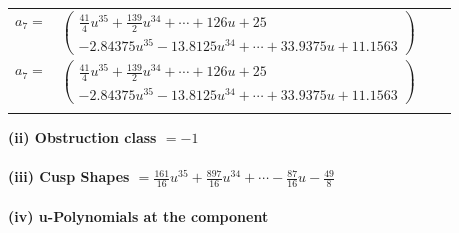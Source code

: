 \documentclass[1p]{elsarticle_modified}
\theoremstyle{definition}
\begin{document}
\begin{tabular}{m{7pt} m{180pt} m{7pt} m{180pt} }
\flushright $a_{7}=$&$\begin{pmatrix}\frac{41}{4} u^{35}+\frac{139}{2} u^{34}+\cdots+126 u+25\\-2.84375 u^{35}-13.8125 u^{34}+\cdots+33.9375 u+11.1563\end{pmatrix}$\\ \flushright $a_{7}=$&$\begin{pmatrix}\frac{41}{4} u^{35}+\frac{139}{2} u^{34}+\cdots+126 u+25\\-2.84375 u^{35}-13.8125 u^{34}+\cdots+33.9375 u+11.1563\end{pmatrix}$\\&\end{tabular}
\flushleft \textbf{(ii) Obstruction class $= -1$}\\~\\
\flushleft \textbf{(iii) Cusp Shapes $= \frac{161}{16} u^{35}+\frac{897}{16} u^{34}+\cdots-\frac{87}{16} u-\frac{49}{8}$}\\~\\
\newpage\renewcommand{\arraystretch}{1}
\flushleft \textbf{(iv) u-Polynomials at the component}\newline \\
\end{document}
